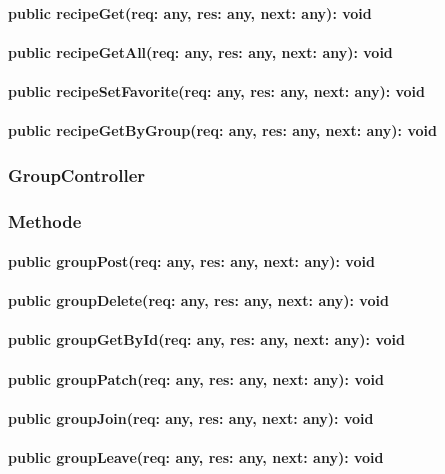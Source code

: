 \documentclass[parskip=full]{scrartcl}
\begin{document}
\paragraph{public recipeGet(req: any, res: any, next: any): void}
\paragraph{public recipeGetAll(req: any, res: any, next: any): void}
\paragraph{public recipeSetFavorite(req: any, res: any, next: any): void}
\paragraph{public recipeGetByGroup(req: any, res: any, next: any): void}

\subsubsection{GroupController}
\subsubsection*{Methode}
\paragraph{public groupPost(req: any, res: any, next: any): void}
\paragraph{public groupDelete(req: any, res: any, next: any): void}
\paragraph{public groupGetById(req: any, res: any, next: any): void}
\paragraph{public groupPatch(req: any, res: any, next: any): void}
\paragraph{public groupJoin(req: any, res: any, next: any): void}
\paragraph{public groupLeave(req: any, res: any, next: any): void}
\end{document}
